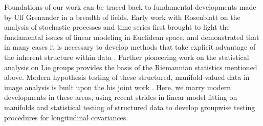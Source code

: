 Foundations of our work can be traced back to fundamental developments made by Ulf Grenander in a breadth of fields. Early work with Rosenblatt on the analysis of stochastic processes and time series first brought to light
the fundamental issues of linear modeling in Euclidean space, and demonstrated that in many cases it is necessary to develop methods that take explicit advantage of the inherent structure within data \citep{grenander1957statistical}.
Further pioneering work on the statistical analysis on Lie groups \citep{grenander2008probabilities} provides the basis of the Riemannian statistics mentioned above.
Modern hypothesis testing of these structured, manifold-valued data in image analysis is built upon the his joint work \citep{grenander1998computational}. Here, we marry modern developments in these areas, using recent strides in linear model fitting on manifolds and statistical testing of structured data to develop groupwise testing procedures for longitudinal covariances.
